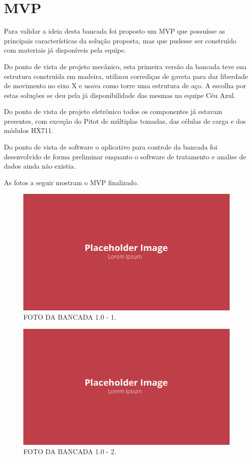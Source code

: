 \section{MVP}

Para validar a ideia desta bancada foi proposto um MVP que possuísse as principais características da solução proposta, mas que pudesse ser construído com materiais já disponíveis pela equipe.

Do ponto de vista de projeto mecânico, esta primeira versão da bancada teve sua estrutura construída em madeira, utilizou corrediças de gaveta para dar liberdade de movimento no eixo X e usava como torre uma estrutura de aço. A escolha por estas soluções se deu pela já disponibilidade das mesmas na equipe Céu Azul.

Do ponto de vista de projeto eletrônico todos os componentes já estavam presentes, com exceção do Pitot de múltiplas tomadas, das células de carga e dos módulos HX711.

Do ponto de vista de software o aplicativo para controle da bancada foi desenvolvido de forma preliminar enquanto o software de tratamento e analise de dados ainda não existia.

As fotos a seguir mostram o MVP finalizado.

\begin{figure}[!ht]
    \centering
    \includegraphics[width=.8\linewidth]{figuras/placeholder.png}
    \caption{FOTO DA BANCADA 1.0 - 1\cite{autor}.}
    \label{fig:placeholder}
\end{figure}

\begin{figure}[!ht]
    \centering
    \includegraphics[width=.8\linewidth]{figuras/placeholder.png}
    \caption{FOTO DA BANCADA 1.0 - 2\cite{autor}.}
    \label{fig:placeholder}
\end{figure}

